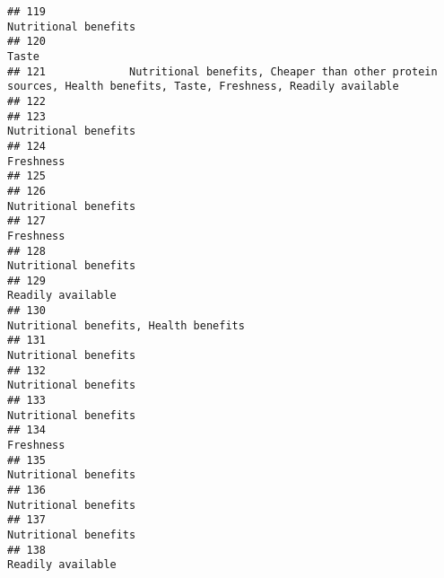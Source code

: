 \documentclass[
]{article}
\begin{document}
\begin{verbatim}
## 119                                                                                                       Nutritional benefits
## 120                                                                                                                      Taste
## 121             Nutritional benefits, Cheaper than other protein sources, Health benefits, Taste, Freshness, Readily available
## 122                                                                                                                           
## 123                                                                                                       Nutritional benefits
## 124                                                                                                                  Freshness
## 125                                                                                                                           
## 126                                                                                                       Nutritional benefits
## 127                                                                                                                  Freshness
## 128                                                                                                       Nutritional benefits
## 129                                                                                                          Readily available
## 130                                                                                      Nutritional benefits, Health benefits
## 131                                                                                                       Nutritional benefits
## 132                                                                                                       Nutritional benefits
## 133                                                                                                       Nutritional benefits
## 134                                                                                                                  Freshness
## 135                                                                                                       Nutritional benefits
## 136                                                                                                       Nutritional benefits
## 137                                                                                                       Nutritional benefits
## 138                                                                                                          Readily available

\end{verbatim}
\end{document}
